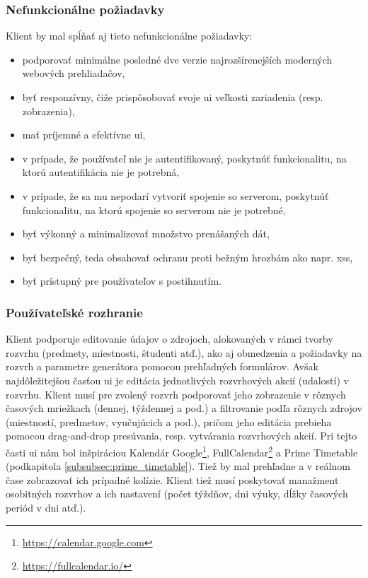 \subsubsection{Nefunkcionálne požiadavky}

Klient by mal spĺňať aj tieto nefunkcionálne požiadavky:

\begin{itemize}
\item podporovať minimálne posledné dve verzie najrozšírenejších moderných
  webových prehliadačov,
\item byť responzívny, čiže prispôsobovať svoje \acrshort{ui} veľkosti
  zariadenia (resp. zobrazenia),
\item mať príjemné a efektívne \acrshort{ui},
\item v prípade, že používateľ nie je autentifikovaný, poskytnúť funkcionalitu,
  na ktorú autentifikácia nie je potrebná,
\item v prípade, že sa mu nepodarí vytvoriť spojenie so serverom, poskytnúť
  funkcionalitu, na ktorú spojenie so serverom nie je potrebné,
\item byť výkonný a minimalizovať množstvo prenášaných dát,
\item byť bezpečný, teda obsahovať ochranu proti bežným hrozbám ako napr.
  \acrfull{xss},
\item byť prístupný pre používateľov s postihnutím.
\end{itemize}

\subsubsection{Používateľské rozhranie}
\label{subsubsec:ui_design}

Klient podporuje editovanie údajov o zdrojoch, alokovaných v rámci tvorby
rozvrhu (predmety, miestnosti, študenti atď.), ako aj obmedzenia a požiadavky na
rozvrh a parametre generátora pomocou prehľadných formulárov. Avšak
najdôležitejšou časťou \acrshort{ui} je editácia jednotlivých rozvrhových akcií
(udalostí) v rozvrhu. Klient musí pre zvolený rozvrh podporovať jeho zobrazenie
v rôznych časových mriežkach (dennej, týždennej a pod.) a filtrovanie podľa
rôznych zdrojov (miestností, predmetov, vyučujúcich a pod.), pričom jeho
editácia prebieha pomocou drag-and-drop presúvania, resp. vytvárania rozvrhových
akcií. Pri tejto časti \acrshort{ui} nám bol inšpiráciou Kalendár
Google\footnote{\url{https://calendar.google.com}},
FullCalendar\footnote{\url{https://fullcalendar.io/}} a Prime Timetable
(podkapitola \ref{subsubsec:prime_timetable}). Tiež by mal prehľadne a v reálnom
čase zobrazovať ich prípadné kolízie. Klient tiež musí poskytovať manažment
osobitných rozvrhov a ich nastavení (počet týždňov, dni výuky, dĺžky časových
periód v dni atď.).

